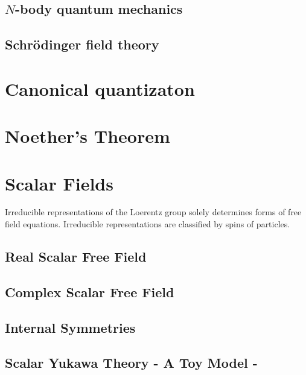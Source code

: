 \documentclass[12pt]{article}
\newcommand{\myqftsrcdirectory}[0]{myqft/src}
\newcommand{\mainqftsrcdirectory}[0]{src_qft}
\newcommand{\srcseventeen}[0]{myqft/versions/2017}
\begin{document}
\subsection{$N$-body quantum mechanics}

\subsection{Schr\"odinger field theory}

\section{Canonical quantizaton}

\section{Noether's Theorem}

%

\section{Scalar Fields}
%
Irreducible representations of the Loerentz group solely 
determines forms of free field equations.
Irreducible representations are classified by
spins of particles.
\subsection{Real Scalar Free Field}

\subsection{Complex Scalar Free Field}
%

\subsection{Internal Symmetries}

\subsection{Scalar Yukawa Theory - A Toy Model -}
\label{sec:ScYukawa}

\end{document}
